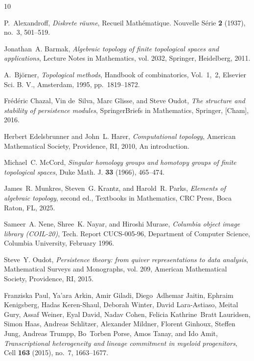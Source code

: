 \documentclass[a4paper,11pt]{article}
\theoremstyle{definition}
\theoremstyle{remark}
\begin{document}
% 
% 


\begin{thebibliography}{10}

P.~Alexandroff, \emph{Diskrete r{\"a}ume}, Recueil Math\'ematique. Nouvelle
  S\'erie \textbf{2} (1937), no.~3, 501--519.

Jonathan~A. Barmak, \emph{Algebraic topology of finite topological spaces and
  applications}, Lecture Notes in Mathematics, vol. 2032, Springer, Heidelberg,
  2011. 

A.~Bj\"orner, \emph{Topological methods}, Handbook of combinatorics, {V}ol.\
  1,\ 2, Elsevier Sci. B. V., Amsterdam, 1995, pp.~1819--1872. 

Fr\'ed\'eric Chazal, Vin de~Silva, Marc Glisse, and Steve Oudot, \emph{The
  structure and stability of persistence modules}, SpringerBriefs in
  Mathematics, Springer, [Cham], 2016. 

Herbert Edelsbrunner and John~L. Harer, \emph{Computational topology}, American
  Mathematical Society, Providence, RI, 2010, An introduction. 

Michael~C. McCord, \emph{Singular homology groups and homotopy groups of finite
  topological spaces}, Duke Math. J. \textbf{33} (1966), 465--474. 

James~R. Munkres, Steven~G. Krantz, and Harold~R. Parks, \emph{Elements of
  algebraic topology}, second ed., Textbooks in Mathematics, CRC Press, Boca
  Raton, FL, 2025. 

Sameer~A. Nene, Shree~K. Nayar, and Hiroshi Murase, \emph{Columbia object image
  library ({COIL}-20)}, Tech. Report CUCS-005-96, Department of Computer
  Science, Columbia University, February 1996.

Steve~Y. Oudot, \emph{Persistence theory: from quiver representations to data
  analysis}, Mathematical Surveys and Monographs, vol. 209, American
  Mathematical Society, Providence, RI, 2015. 

Franziska Paul, Ya'ara Arkin, Amir Giladi, Diego~Adhemar Jaitin, Ephraim
  Kenigsberg, Hadas Keren-Shaul, Deborah Winter, David Lara-Astiaso, Meital
  Gury, Assaf Weiner, Eyal David, Nadav Cohen, Felicia Kathrine~Bratt
  Lauridsen, Simon Haas, Andreas Schlitzer, Alexander Mildner, Florent Ginhoux,
  Steffen Jung, Andreas Trumpp, Bo~Torben Porse, Amos Tanay, and Ido Amit,
  \emph{Transcriptional heterogeneity and lineage commitment in myeloid
  progenitors}, Cell \textbf{163} (2015), no.~7, 1663--1677.


\end{thebibliography}
\end{document}

